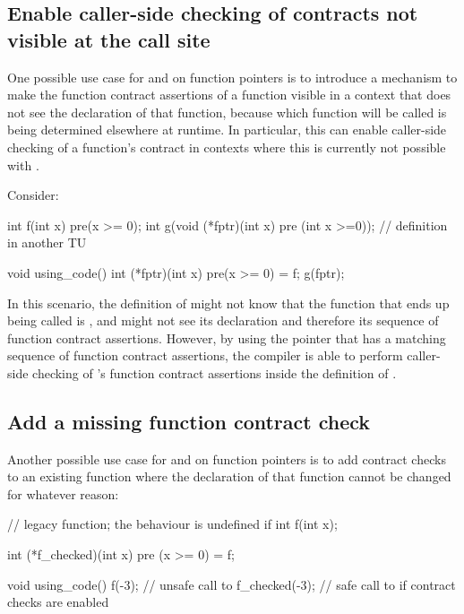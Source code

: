 \subsection{Enable caller-side checking of contracts not visible at the call site}
\label{usecase_ville}

One possible use case for  and  on function pointers is to introduce a mechanism to make the function contract assertions of a function visible in a context that does not see the declaration of that function, because which function will be called is being determined elsewhere at runtime. In particular, this can enable caller-side checking of a function's contract in contexts where this is currently not possible with \cite{P2900R8}.

Consider:
\begin{codeblock}
int f(int x) pre(x >= 0);
int g(void (*fptr)(int x) pre (int x >=0)); // definition in another TU

void using_code() {
   int (*fptr)(int x) pre(x >= 0) = f;
   g(fptr);
}
\end{codeblock}
In this scenario, the definition of  might not know that the function that ends up being called is , and might not see its declaration and therefore its sequence of function contract assertions. However, by using the pointer  that has a matching sequence of function contract assertions, the compiler is able to perform caller-side checking of 's function contract assertions inside the definition of .


\subsection{Add a missing function contract check}
\label{usecase_addmissing}

Another possible use case for  and  on function pointers is to add contract checks to an existing function where the declaration of that function cannot be changed for whatever reason:
\begin{codeblock}
// legacy function; the behaviour is undefined if 
int f(int x);   

int (*f_checked)(int x) pre (x >= 0) = f; 

void using_code() {
  f(-3);          // unsafe call to 
  f_checked(-3);  // safe call to  if contract checks are enabled
}
\end{codeblock}


